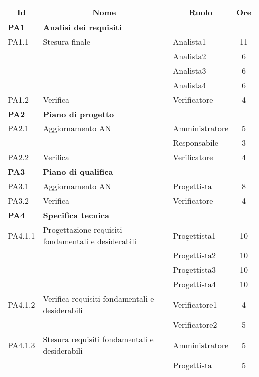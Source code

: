 	\begin{table}[H]
	\centering
	\begin{tabular}{ l l l c  }
	\hline
	\multicolumn{1}{c}{\textbf{Id}} & 
	\multicolumn{1}{c}{\textbf{Nome}} & 
	\multicolumn{1}{c}{\textbf{Ruolo}}& 
	\multicolumn{1}{c}{\textbf{Ore}} \\
	\hline
	
	\textbf{PA1} & \textbf{Analisi dei requisiti} \\
	\cline{3-4}
	PA1.1 & Stesura finale & Analista1 & 11\\ 
    & & Analista2 & 6\\
    & & Analista3 & 6\\
     & & Analista4 & 6\\
    \cline{3-4}
	PA1.2 & Verifica & Verificatore &  4\\
	
	\hline
	\textbf{PA2} & \textbf{Piano di progetto} \\
	\cline{3-4}
	PA2.1 & Aggiornamento AN & Amministratore & 5\\ 
    & & Responsabile & 3\\
    \cline{3-4}
	PA2.2 & Verifica & Verificatore & 4\\
	
	\hline
	\textbf{PA3} & \textbf{Piano di qualifica} \\
	\cline{3-4}
	PA3.1 & Aggiornamento AN & Progettista & 8\\ 
    \cline{3-4}
	PA3.2 & Verifica & Verificatore &  4\\
	
	\hline
	\textbf{PA4} & \textbf{Specifica tecnica} \\
	\cline{3-4}
	PA4.1.1 & Progettazione requisiti fondamentali e desiderabili & Progettista1 & 10\\ 
	& & Progettista2 & 10\\
	& & Progettista3 & 10\\
	& & Progettista4 & 10\\
    \cline{3-4}
	PA4.1.2 & Verifica requisiti fondamentali e desiderabili & Verificatore1 &  4\\
	& & Verificatore2 & 5\\
	\cline{3-4}
	PA4.1.3 & Stesura requisiti fondamentali e desiderabili & Amministratore &  5\\
	& & Progettista & 5\\
	

\end{tabular}
\end{table}
